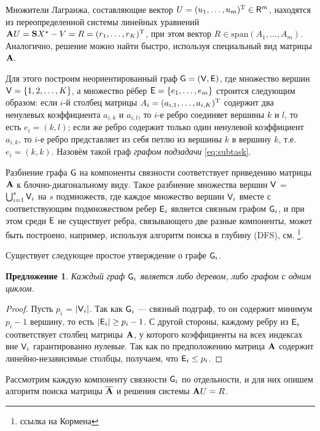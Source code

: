 \documentclass[10pt]{article}
\newtheorem{proposition}{Предложение}
\begin{document}
Множители Лагранжа, составляющие вектор $U = (u_1, \ldots, u_m)^{\mathrm{T}} \in \mathsf{R}^{m}$, находятся из переопределенной системы линейных уравнений $\mathbf{A} U =  \mathbf{S} X^\star - V = R = (r_1, \ldots, r_K)^{\mathrm{T}}$, при этом вектор $R \in \text{span}(A_1, \ldots, A_m)$. Аналогично, решение можно найти быстро, используя специальный вид матрицы $\mathbf{A}$.

Для этого построим неориентированный граф $\mathsf{G}=(\mathsf{V}, \mathsf{E})$, где множество вершин $\mathsf{V} = \{1, 2, \ldots, K\}$, а множество рёбер $\mathsf{E} = \{e_1, \ldots, e_m\}$ строится следующим образом: если $i$-й столбец матрицы $A_i = (a_{i, 1}, \ldots, a_{i, K})^{\mathrm{T}}$ содержит два ненулевых коэффициента $a_{i,k}$ и $a_{i,l}$, то $i$-е ребро соединяет вершины $k$ и $l$, то есть $e_i = (k, l)$; если же ребро содержит только один ненулевой коэффициент $a_{i,k}$, то $i$-е ребро представляет из себя петлю из вершины $k$ в вершину $k$, т.е. $e_i=(k, k)$. Назовём такой граф \emph{графом подзадачи} \eqref{eq:subtask}.

Разбиение графа $\mathsf{G}$ на компоненты связности соответствует приведению матрицы $\mathbf{A}$ к блочно-диагональному виду. Такое разбиение множества вершин $\mathsf{V}$ = $\bigcup_{i=1}^{s} \mathsf{V}_i$ на $s$ подмножеств, где каждое множество вершин $\mathsf{V}_i$ вместе с соответствующим подмножеством ребер $\mathsf{E}_i$ является связным графом $\mathsf{G}_i$, и при этом среди $\mathsf{E}$ не существует ребра, связывающего две разные компоненты, может быть построено, например, используя алгоритм поиска в глубину (DFS), см. \footnote{ссылка на Кормена}.

Существует следующее простое утверждение о графе $\mathsf{G}_i$.
\begin{proposition}
Каждый граф $\mathsf{G}_i$ является либо деревом, либо графом с одним циклом.
\end{proposition}
\begin{proof}
Пусть $p_i$ = $|\mathsf{V}_i|$. Так как $\mathsf{G}_i$ --- связный подграф, то он содержит минимум $p_i - 1$ вершину, то есть $|\mathsf{E}_i| \ge p_i - 1$. С другой стороны, каждому ребру из $\mathsf{E}_i$ соответствует столбец матрицы $\mathbf{A}$, у которого коэффициенты на всех индексах вне $\mathsf{V}_i$ гарантированно нулевые. Так как по предположению матрица $\mathbf{A}$ содержит линейно-независимые столбцы, получаем, что $\mathsf{E}_i \le p_i$.
\end{proof}

Рассмотрим каждую компоненту связности $\mathsf{G}_i$ по отдельности, и для них опишем алгоритм поиска матрицы $\overline {\mathbf{A}}$ и решения системы $\mathbf{A} U = R$.
\end{document}
